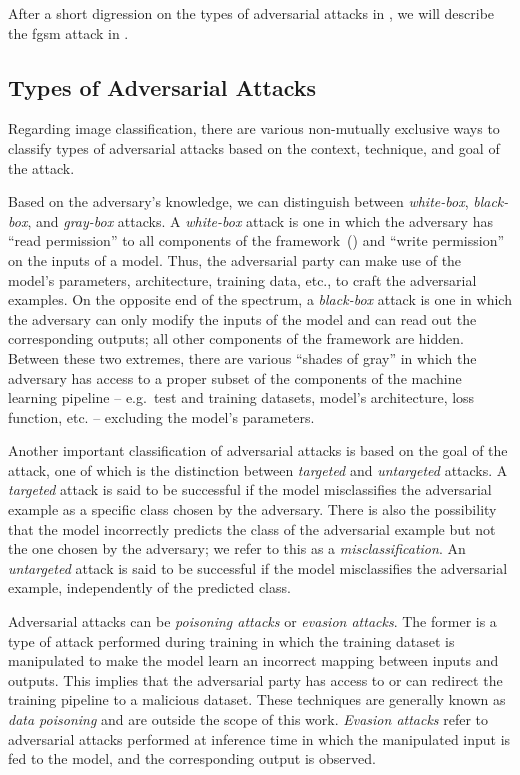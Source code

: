 After a short digression on the types of adversarial attacks in , we will describe the \acrshort{fgsm} attack in .

\subsection{Types of Adversarial Attacks}
\label{subsec:types-adversarial-attacks}
Regarding image classification, there are various non-mutually exclusive ways to classify types of adversarial attacks based on the context, technique, and goal of the attack.

Based on the adversary's knowledge, we can distinguish between \emph{white-box}, \emph{black-box}, and \emph{gray-box} attacks.
A \emph{white-box} attack is one in which the adversary has ``read permission'' to all components of the framework~() and ``write permission'' on the inputs of a model. Thus, the adversarial party can make use of the model's parameters, architecture, training data, etc., to craft the adversarial examples.
On the opposite end of the spectrum, a \emph{black-box} attack is one in which the adversary can only modify the inputs of the model and can read out the corresponding outputs; all other components of the framework are hidden.
Between these two extremes, there are various ``shades of gray'' in which the adversary has access to a proper subset of the components of the machine learning pipeline -- e.g.\ test and training datasets, model's architecture, loss function, etc. -- excluding the model's parameters.

Another important classification of adversarial attacks is based on the goal of the attack, one of which is the distinction between \emph{targeted} and \emph{untargeted} attacks.
A \emph{targeted} attack is said to be successful if the model misclassifies the adversarial example as a specific class chosen by the adversary. There is also the possibility that the model incorrectly predicts the class of the adversarial example but not the one chosen by the adversary; we refer to this as a \emph{misclassification}.
An \emph{untargeted} attack is said to be successful if the model misclassifies the adversarial example, independently of the predicted class.

Adversarial attacks can be \emph{poisoning attacks} or \emph{evasion attacks}.
The former is a type of attack performed during training in which the training dataset is manipulated to make the model learn an incorrect mapping between inputs and outputs. This implies that the adversarial party has access to or can redirect the training pipeline to a malicious dataset. These techniques are generally known as \emph{data poisoning} and are outside the scope of this work.
\emph{Evasion attacks} refer to adversarial attacks performed at inference time in which the manipulated input is fed to the model, and the corresponding output is observed.

